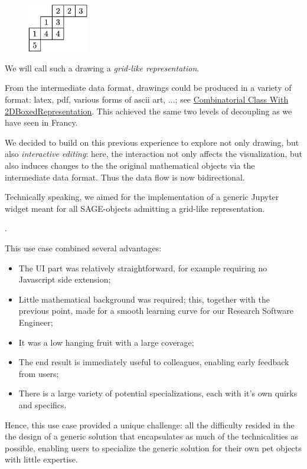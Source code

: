 \documentclass{deliverablereport}
\begin{document}
\begin{figure}
    \begin{center}
      \includegraphics[width=100px]{images/JDTSlide}
\end{center}
\end{figure}
We will call such a drawing a \emph{grid-like representation}.

From the intermediate data format, drawings could be produced in a
variety of format: latex, pdf, various forms of ascii art, ...; see
\href{http://mupad-combinat.sourceforge.net/doc/en/Cat_Combinat/CombinatorialClassWith2DBoxedRepresentation.html}{Combinatorial Class With 2DBoxedRepresentation}.
This achieved the same two levels of decoupling as we have seen in Francy.

We decided to build on this previous experience to explore not only
drawing, but also \emph{interactive editing}: here, the interaction
not only affects the visualization, but also induces changes to the
the original mathematical objects via the intermediate data format.
Thus the data flow is now bidirectional.

Technically speaking, we aimed for the implementation of a generic
Jupyter widget meant for all SAGE-objects admitting a grid-like
representation.

.

This use case combined several advantages:
\begin{itemize}
\item The UI part was relatively straightforward, for example
  requiring no Javascript side extension;
\item Little mathematical background was required; this, together with
  the previous point, made for a smooth learning curve for our
  Research Software Engineer;
\item It was a low hanging fruit with a large coverage;
\item The end result is immediately useful to colleagues, enabling
  early feedback from users;
\item There is a large variety of potential specializations, each with
  it's own quirks and specifics.
\end{itemize}
Hence, this use case provided a unique challenge: all the difficulty
resided in the the design of a generic solution that encapsulates as
much of the technicalities as possible, enabling users to specialize
the generic solution for their own pet objects with little expertise.
\end{document}
